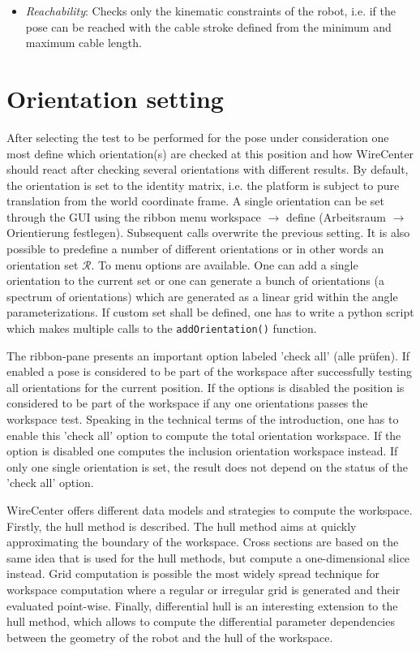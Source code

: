 \documentclass[11pt,a4paper,onepage,openany]{book}
\begin{document}
\begin{itemize}
\item \emph{Reachability}: Checks only the kinematic constraints of the
    robot, i.e. if the pose can be reached with the cable stroke defined
    from
    the minimum and maximum cable length.
\end{itemize}

\section{Orientation setting}
After selecting the test to be performed for the pose under consideration one
most define which orientation(s) are checked at this position and how
WireCenter should react after checking several orientations with different
results. By default, the orientation is set to the identity matrix, i.e. the
platform is subject to pure translation from the world coordinate frame. A
single orientation can be set through the GUI using the ribbon menu workspace
$\rightarrow$ define (Arbeitsraum $\rightarrow$ Orientierung festlegen).
Subsequent calls overwrite the previous setting. It is also possible to
predefine a number of different orientations or in other words an orientation
set $\mathcal R$. To menu options are available. One can add a single
orientation to the current set or one can generate a bunch of orientations (a
spectrum of orientations) which are generated as a linear grid within the angle
parameterizations. If custom set shall be defined, one has to write a python
script which makes multiple calls to the \texttt{addOrientation()} function.

The ribbon-pane presents an important option labeled 'check all' (alle
pr\"ufen). If enabled a pose is considered to be part of the workspace after
successfully testing all orientations for the current position. If the options
is disabled the position is considered to be part of the workspace if any one
orientations passes the workspace test. Speaking in the technical terms of the
introduction, one has to enable this 'check all' option to compute the total
orientation workspace. If the option is disabled one computes the inclusion
orientation workspace instead. If only one single orientation is set, the
result does not depend on the status of the 'check all' option.

WireCenter offers different data models and strategies to compute the
workspace. Firstly, the hull method is described. The hull method aims at
quickly approximating the boundary of the workspace. Cross sections are based
on the same idea that is used for the hull methods, but compute a one-dimensional
slice instead. Grid computation is possible the most widely spread
technique for workspace computation where a regular or irregular grid is
generated and their evaluated point-wise. Finally, differential hull is an
interesting extension to the hull method, which allows to compute the
differential parameter dependencies between the geometry of the robot and the
hull of the workspace.
\end{document}
